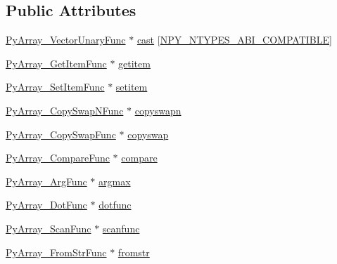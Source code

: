 \subsection*{Public Attributes}
\begin{DoxyCompactItemize}
\item 
\hyperlink{ndarraytypes_8h_afc77e390d08d3b1caa43b95d789cef46}{Py\+Array\+\_\+\+Vector\+Unary\+Func} $\ast$ \hyperlink{structPyArray__ArrFuncs_a0f3fcf061513912cf201e833da3793ba}{cast} \mbox{[}\hyperlink{ndarraytypes_8h_ae15cea9045111facdbe2293eac040e56a2def2b831a763c7d3ffc6867f39da203}{N\+P\+Y\+\_\+\+N\+T\+Y\+P\+E\+S\+\_\+\+A\+B\+I\+\_\+\+C\+O\+M\+P\+A\+T\+I\+B\+LE}\mbox{]}
\item 
\hyperlink{ndarraytypes_8h_a4f9341f0faf71e1bbb2e86981ac878a9}{Py\+Array\+\_\+\+Get\+Item\+Func} $\ast$ \hyperlink{structPyArray__ArrFuncs_a3865507c3a081205063608ed10854de7}{getitem}
\item 
\hyperlink{ndarraytypes_8h_aab048ca75fb31703762fda67d2666531}{Py\+Array\+\_\+\+Set\+Item\+Func} $\ast$ \hyperlink{structPyArray__ArrFuncs_aa39f52bd4da731813293d757635d49e6}{setitem}
\item 
\hyperlink{ndarraytypes_8h_aeab97280f4d0ef137ff4bdb187134481}{Py\+Array\+\_\+\+Copy\+Swap\+N\+Func} $\ast$ \hyperlink{structPyArray__ArrFuncs_a8a872a121cc3cef06c47db655a15f61a}{copyswapn}
\item 
\hyperlink{ndarraytypes_8h_a0dcacef2e2efd85ee55a1516a7e26ba1}{Py\+Array\+\_\+\+Copy\+Swap\+Func} $\ast$ \hyperlink{structPyArray__ArrFuncs_a3bf4ac698a5aa0a1589c48fce99dde75}{copyswap}
\item 
\hyperlink{ndarraytypes_8h_a1bb6eebdea5a5b4eaae721ef26cbd20f}{Py\+Array\+\_\+\+Compare\+Func} $\ast$ \hyperlink{structPyArray__ArrFuncs_a69981ee8ed4c4c673404a9d6e3407a47}{compare}
\item 
\hyperlink{ndarraytypes_8h_a257e44e2b89a2689ac102ea7fa6e9a52}{Py\+Array\+\_\+\+Arg\+Func} $\ast$ \hyperlink{structPyArray__ArrFuncs_a650048fdfb183b8b2596d250d5206fbf}{argmax}
\item 
\hyperlink{ndarraytypes_8h_af837312e9d8e350d60415957236e3026}{Py\+Array\+\_\+\+Dot\+Func} $\ast$ \hyperlink{structPyArray__ArrFuncs_a2763541bd95eae9146709afdfb1f3d88}{dotfunc}
\item 
\hyperlink{ndarraytypes_8h_a37b9c5b02b92ad8b164dca078e2eb92d}{Py\+Array\+\_\+\+Scan\+Func} $\ast$ \hyperlink{structPyArray__ArrFuncs_af844eb100b0145268ea5f825eadd163e}{scanfunc}
\item 
\hyperlink{ndarraytypes_8h_a8aecfd136d9f74034739b3f4e7981c65}{Py\+Array\+\_\+\+From\+Str\+Func} $\ast$ \hyperlink{structPyArray__ArrFuncs_a3bca6e13f336beb7160fd3d5ccbe4292}{fromstr}

\end{DoxyCompactItemize}
